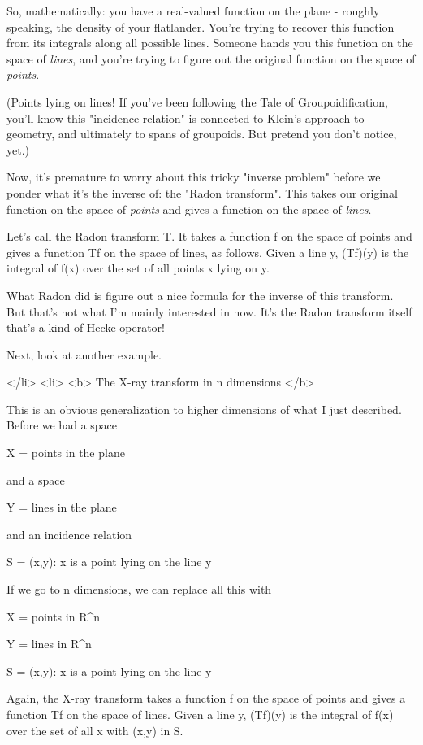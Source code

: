 So, mathematically: you have a real-valued function on the plane -
roughly speaking, the density of your flatlander.  You're trying 
to recover this function from its integrals along all possible 
lines.  Someone hands you this function on the space of \emph{lines}, 
and you're trying to figure out the original function on the space
of \emph{points}. 

(Points lying on lines!   If you've been following the Tale of 
Groupoidification, you'll know this "incidence relation" is 
connected to Klein's approach to geometry, and ultimately to 
spans of groupoids.  But pretend you don't notice, yet.)

Now, it's premature to worry about this tricky "inverse problem"
before we ponder what it's the inverse of: the "Radon transform".  
This takes our original function on the space of \emph{points} and 
gives a function on the space of \emph{lines}.

Let's call the Radon transform T.  It takes a function f on the 
space of points and gives a function Tf on the space of lines, 
as follows.  Given a line y, (Tf)(y) is the integral of f(x) over 
the set of all points x lying on y.

What Radon did is figure out a nice formula for the inverse of 
this transform.  But that's not what I'm mainly interested in now.  
It's the Radon transform itself that's a kind of Hecke operator!

Next, look at another example.

</li>
<li>
<b>
The X-ray transform in n dimensions
</b>

This is an obvious generalization to higher dimensions of what 
I just described.  Before we had a space

X = {points in the plane}

and a space

Y = {lines in the plane}

and an incidence relation

S = {(x,y): x is a point lying on the line y}

If we go to n dimensions, we can replace all this with

X = {points in R^{n}}

Y = {lines in R^{n}}

S = {(x,y): x is a point lying on the line y}

Again, the X-ray transform takes a function f on the space of 
points and gives a function Tf on the space of lines.  Given a 
line y, (Tf)(y) is the integral of f(x) over the set of all x
with (x,y) in S.

